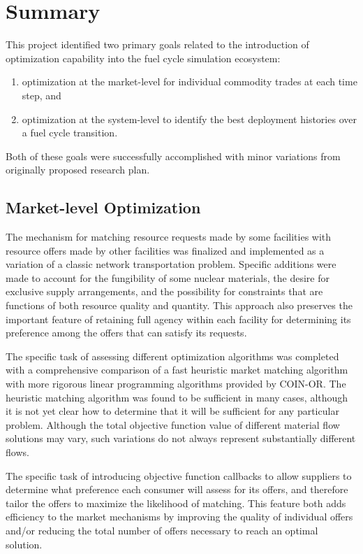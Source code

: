 \section{Summary}

This project identified two primary goals related to the introduction of
optimization capability into the \Cyclus{} fuel cycle simulation ecosystem:
\begin{enumerate}
\item optimization at the market-level for individual commodity trades at each time step, and 
\item optimization at the system-level to identify the best deployment
  histories over a fuel cycle transition.
\end{enumerate}
\noindent Both of these goals were successfully accomplished with minor variations from
originally proposed research plan.

\subsection{Market-level Optimization}

The mechanism for matching resource requests made by some facilities with
resource offers made by other facilities was finalized and implemented as a
variation of a classic network transportation problem.  Specific additions
were made to account for the fungibility of some nuclear materials, the desire
for exclusive supply arrangements, and the possibility for constraints that
are functions of both resource quality and quantity.  This approach also
preserves the important feature of retaining full agency within each facility
for determining its preference among the offers that can satisfy its requests.

The specific task of assessing different optimization algorithms was completed
with a comprehensive comparison of a fast heuristic market matching algorithm
with more rigorous linear programming algorithms provided by \gls{COIN-OR}.
The heuristic matching algorithm was found to be sufficient in many cases,
although it is not yet clear how to determine that it will be sufficient for
any particular problem.  Although the total objective function value of
different material flow solutions may vary, such variations do not always
represent substantially different flows.

The specific task of introducing objective function callbacks to allow
suppliers to determine what preference each consumer will assess for its
offers, and therefore tailor the offers to maximize the likelihood of
matching.  This feature both adds efficiency to the market mechanisms by
improving the quality of individual offers and/or reducing the total number of
offers necessary to reach an optimal solution.

